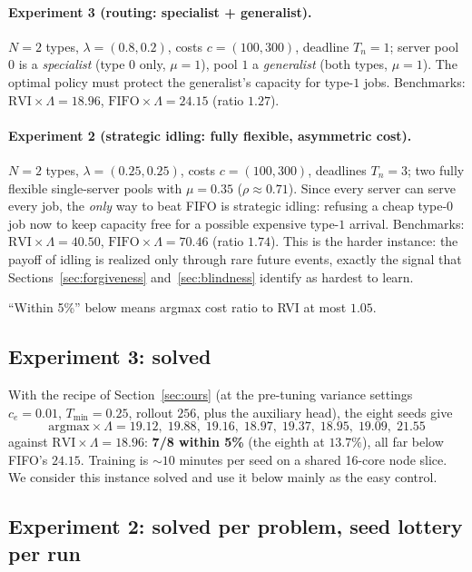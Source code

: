 \documentclass[11pt,a4paper]{article}
\begin{document}
\paragraph{Experiment 3 (routing: specialist + generalist).}
$N = 2$ types, $\lambda = (0.8, 0.2)$, costs $c = (100, 300)$, deadline
$T_n = 1$; server pool $0$ is a \emph{specialist} (type $0$ only,
$\mu = 1$), pool $1$ a \emph{generalist} (both types, $\mu = 1$).  The
optimal policy must protect the generalist's capacity for type-$1$ jobs.
Benchmarks: $\mathrm{RVI}\times\Lambda = 18.96$,
$\mathrm{FIFO}\times\Lambda = 24.15$ (ratio $1.27$).

\paragraph{Experiment 2 (strategic idling: fully flexible, asymmetric
cost).}
$N = 2$ types, $\lambda = (0.25, 0.25)$, costs $c = (100, 300)$,
deadlines $T_n = 3$; two fully flexible single-server pools with
$\mu = 0.35$ ($\rho \approx 0.71$).  Since every server can serve every
job, the \emph{only} way to beat FIFO is strategic idling: refusing a
cheap type-$0$ job now to keep capacity free for a possible expensive
type-$1$ arrival.  Benchmarks: $\mathrm{RVI}\times\Lambda = 40.50$,
$\mathrm{FIFO}\times\Lambda = 70.46$ (ratio $1.74$).  This is the harder
instance: the payoff of idling is realized only through rare future
events, exactly the signal that Sections~\ref{sec:forgiveness}
and~\ref{sec:blindness} identify as hardest to learn.

``Within 5\%'' below means argmax cost ratio to RVI at most $1.05$.

\subsection{Experiment 3: solved}
\label{sec:exp3}

With the recipe of Section~\ref{sec:ours} (at the pre-tuning variance
settings $c_e = 0.01$, $T_{\min} = 0.25$, rollout $256$, plus the
auxiliary head), the eight seeds give
\[
  \mathrm{argmax}\times\Lambda =
  19.12,\; 19.88,\; 19.16,\; 18.97,\; 19.37,\; 18.95,\; 19.09,\; 21.55
\]
against $\mathrm{RVI}\times\Lambda = 18.96$: \textbf{7/8 within 5\%}
(the eighth at $13.7\%$), all far below FIFO's $24.15$.  Training is
${\sim}10$ minutes per seed on a shared 16-core node slice.  We consider
this instance solved and use it below mainly as the easy control.

\subsection{Experiment 2: solved per problem, seed lottery per run}
\label{sec:exp2}
\end{document}
